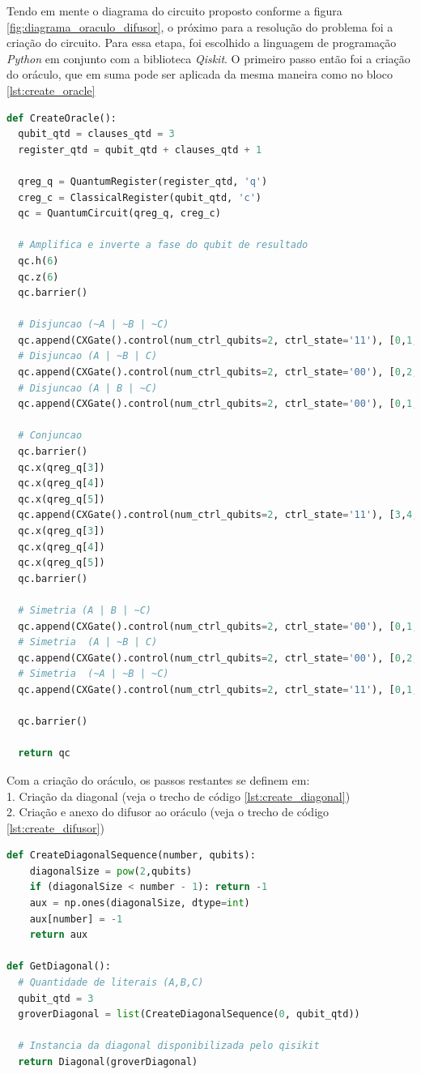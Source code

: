 \documentclass[12pt]{article}
\begin{document}
Tendo em mente o diagrama do circuito proposto conforme a figura \ref{fig:diagrama_oraculo_difusor}, o próximo para a resolução do problema foi a criação do circuito. Para essa etapa, foi escolhido a linguagem de programação \textit{Python} em conjunto com a biblioteca \textit{Qiskit}.
O primeiro passo então foi a criação do oráculo, que em suma pode ser aplicada da mesma maneira como no bloco \ref{lst:create_oracle}
\begin{lstlisting}[language=Python, caption={Criação do oráculo}, frame=single, label={lst:create_oracle}]
def CreateOracle():
  qubit_qtd = clauses_qtd = 3
  register_qtd = qubit_qtd + clauses_qtd + 1

  qreg_q = QuantumRegister(register_qtd, 'q')
  creg_c = ClassicalRegister(qubit_qtd, 'c')
  qc = QuantumCircuit(qreg_q, creg_c)

  # Amplifica e inverte a fase do qubit de resultado
  qc.h(6)
  qc.z(6)
  qc.barrier()
  
  # Disjuncao (~A | ~B | ~C)
  qc.append(CXGate().control(num_ctrl_qubits=2, ctrl_state='11'), [0,1,2,3])
  # Disjuncao (A | ~B | C)
  qc.append(CXGate().control(num_ctrl_qubits=2, ctrl_state='00'), [0,2,1,4])
  # Disjuncao (A | B | ~C)
  qc.append(CXGate().control(num_ctrl_qubits=2, ctrl_state='00'), [0,1,2,5])

  # Conjuncao
  qc.barrier()
  qc.x(qreg_q[3])
  qc.x(qreg_q[4])
  qc.x(qreg_q[5])
  qc.append(CXGate().control(num_ctrl_qubits=2, ctrl_state='11'), [3,4,5,6])
  qc.x(qreg_q[3])
  qc.x(qreg_q[4])
  qc.x(qreg_q[5])
  qc.barrier()

  # Simetria (A | B | ~C)
  qc.append(CXGate().control(num_ctrl_qubits=2, ctrl_state='00'), [0,1,2,5])
  # Simetria  (A | ~B | C)
  qc.append(CXGate().control(num_ctrl_qubits=2, ctrl_state='00'), [0,2,1,4])
  # Simetria  (~A | ~B | ~C)
  qc.append(CXGate().control(num_ctrl_qubits=2, ctrl_state='11'), [0,1,2,3])

  qc.barrier()

  return qc
\end{lstlisting}
Com a criação do oráculo, os passos restantes se definem em: \\
1. Criação da diagonal (veja o trecho de código \ref{lst:create_diagonal})\\
2. Criação e anexo do difusor ao oráculo (veja o trecho de código \ref{lst:create_difusor})\\

\begin{lstlisting}[language=Python, caption={Criação da diagonal}, frame=single, label={lst:create_diagonal}]
def CreateDiagonalSequence(number, qubits):
    diagonalSize = pow(2,qubits)
    if (diagonalSize < number - 1): return -1
    aux = np.ones(diagonalSize, dtype=int)
    aux[number] = -1
    return aux

def GetDiagonal():
  # Quantidade de literais (A,B,C)
  qubit_qtd = 3
  groverDiagonal = list(CreateDiagonalSequence(0, qubit_qtd))
  
  # Instancia da diagonal disponibilizada pelo qisikit
  return Diagonal(groverDiagonal) 
\end{lstlisting}
\end{document}
